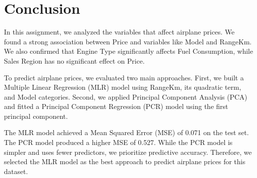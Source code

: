\newpage
\section*{Conclusion} 
\label{cha:conclusion}

In this assignment, we analyzed the variables that affect airplane prices. We found a strong association between Price and variables like Model and RangeKm. We also confirmed that Engine Type significantly affects Fuel Consumption, while Sales Region has no significant effect on Price.

To predict airplane prices, we evaluated two main approaches. First, we built a Multiple Linear Regression (MLR) model using RangeKm, its quadratic term, and Model categories. Second, we applied Principal Component Analysis (PCA) and fitted a Principal Component Regression (PCR) model using the first principal component.

The MLR model achieved a Mean Squared Error (MSE) of 0.071 on the test set. The PCR model produced a higher MSE of 0.527. While the PCR model is simpler and uses fewer predictors, we prioritize predictive accuracy. Therefore, we selected the MLR model as the best approach to predict airplane prices for this dataset.
